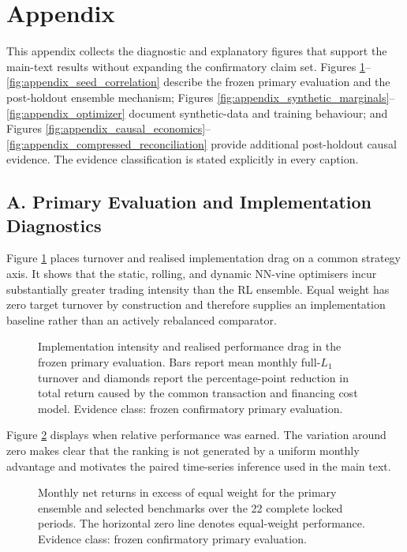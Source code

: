 \section*{Appendix}
\label{sec:appendix}

This appendix collects the diagnostic and explanatory figures that support the
main-text results without expanding the confirmatory claim set. Figures
\ref{fig:appendix_implementation_drag}--\ref{fig:appendix_seed_correlation}
describe the frozen primary evaluation and the post-holdout ensemble mechanism;
Figures \ref{fig:appendix_synthetic_marginals}--\ref{fig:appendix_optimizer}
document synthetic-data and training behaviour; and Figures
\ref{fig:appendix_causal_economics}--\ref{fig:appendix_compressed_reconciliation}
provide additional post-holdout causal evidence. The evidence classification is
stated explicitly in every caption.

\subsection*{A. Primary Evaluation and Implementation Diagnostics}

Figure \ref{fig:appendix_implementation_drag} places turnover and realised
implementation drag on a common strategy axis. It shows that the static,
rolling, and dynamic NN-vine optimisers incur substantially greater trading
intensity than the RL ensemble. Equal weight has zero target turnover by
construction and therefore supplies an implementation baseline rather than an
actively rebalanced comparator.

\begin{figure}[!tbp]
\centering

\caption{Implementation intensity and realised performance drag in the frozen
primary evaluation. Bars report mean monthly full-$L_1$ turnover and diamonds
report the percentage-point reduction in total return caused by the common
transaction and financing cost model. Evidence class: frozen confirmatory
primary evaluation.}
\label{fig:appendix_implementation_drag}
\end{figure}

Figure \ref{fig:appendix_monthly_excess} displays when relative performance was
earned. The variation around zero makes clear that the ranking is not generated
by a uniform monthly advantage and motivates the paired time-series inference
used in the main text.

\begin{figure}[!tbp]
\centering

\caption{Monthly net returns in excess of equal weight for the primary ensemble
and selected benchmarks over the 22 complete locked periods. The horizontal
zero line denotes equal-weight performance. Evidence class: frozen confirmatory
primary evaluation.}
\label{fig:appendix_monthly_excess}
\end{figure}

